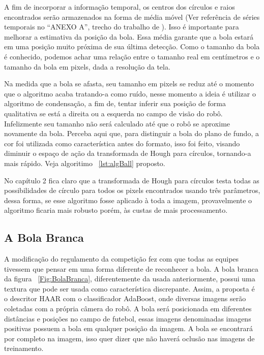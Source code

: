 A fim de incorporar a informação temporal, os centros dos círculos e raios encontrados serão armazenados na forma de média móvel (Ver referência de séries temporais no “ANEXO A”, trecho do trabalho de ). Isso é importante para melhorar a estimativa da posição da bola. Essa média garante que a bola estará em uma posição muito próxima de sua última detecção. Como o tamanho da bola é conhecido, podemos achar uma relação entre o tamanho real em centímetros e o tamanho da bola em pixels, dada a resolução da tela.

Na medida que a bola se afasta, seu tamanho em pixels se reduz até o momento que o algoritmo acaba tratando-a como ruído, nesse momento a ideia é utilizar o algoritmo de condensação, a fim de, tentar inferir sua posição de forma qualitativa se está a direita ou a esquerda no campo de visão do robô. Infelizmente seu tamanho não será calculado até que o robô se aproxime novamente da bola. Perceba aqui que, para distinguir a bola do plano de fundo, a cor foi utilizada como característica antes do formato, isso foi feito, visando diminuir o espaço de ação da transformada de Hough para círculos, tornando-a mais rápido. Veja algoritimo ~\ref{lst:algBall} proposto. 

No capítulo 2 fica claro que a transformada de Hough para círculos testa todas as possibilidades de círculo para todos os pixels encontrados usando três parâmetros, dessa forma, se esse algoritmo fosse aplicado à toda a imagem, provavelmente o algoritmo ficaria mais robusto porém, às custas de mais processamento.

\subsection{A Bola Branca}

A modificação do regulamento da competição fez com que todas as equipes tivessem que pensar em uma forma diferente de reconhecer a bola. A bola branca da figura ~\ref{Fig:BolaBranca}, diferentemente da usada anteriormente, possui uma textura que pode ser usada como característica discrepante. Assim, a proposta é o descritor HAAR com o classificador AdaBoost, onde diversas imagens serão coletadas com a própria câmera do robô. A bola será posicionada em diferentes distâncias e posições no campo de futebol, essas imagens denominadas imagens positivas possuem a bola em qualquer posição da imagem. A bola se encontrará por completo na imagem, isso quer dizer que não haverá oclusão nas imagens de treinamento.


